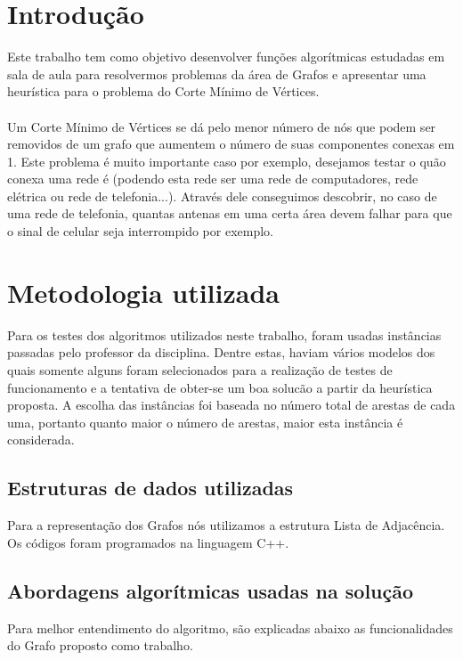 \documentclass[a4paper, 12pt]{article}
\begin{document}
\newpage
{}

\section{Introdução}

Este trabalho tem como objetivo desenvolver funções algorítmicas estudadas em sala de aula para resolvermos problemas da área de Grafos e apresentar uma heurística para o problema do Corte Mínimo de Vértices.
\\ \\ \indent Um Corte Mínimo de Vértices se dá pelo menor número de nós que podem ser removidos de um grafo que aumentem o número de suas componentes conexas em 1. Este problema é muito importante caso por exemplo, desejamos testar
o quão conexa uma rede é (podendo esta rede ser uma rede de computadores, rede elétrica ou rede de telefonia...). Através dele conseguimos descobrir, no caso de uma rede de telefonia, quantas antenas em uma certa área devem falhar para que o sinal de celular seja interrompido por exemplo.
\section{Metodologia utilizada}

Para os testes dos algoritmos utilizados neste trabalho, foram usadas instâncias passadas pelo professor da disciplina. Dentre estas, haviam vários modelos dos quais somente alguns foram selecionados para a realização de testes de funcionamento e a tentativa de obter-se um boa solucão a partir da heurística proposta. A escolha das instâncias foi baseada no número total de arestas de cada uma, portanto quanto maior o número de arestas, maior esta instância é considerada.

\subsection{Estruturas de dados utilizadas}

Para a representação dos Grafos nós utilizamos a estrutura Lista de Adjacência. Os códigos foram programados na linguagem C++.
\subsection{Abordagens algorítmicas usadas na solução}
Para melhor entendimento do algoritmo, são explicadas abaixo as funcionalidades do Grafo proposto como trabalho.
\end{document}
